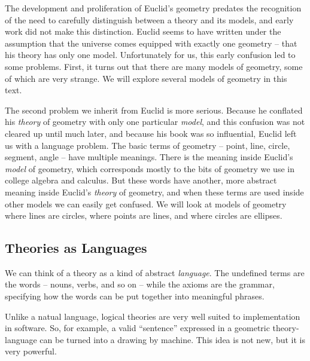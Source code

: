 The development and proliferation of Euclid's geometry predates the recognition of the need to carefully distinguish between a theory and its models, and early work did not make this distinction.
Euclid seems to have written under the assumption that the universe comes equipped with exactly one geometry -- that his theory has only one model.
Unfortunately for us, this early confusion led to some problems.
First, it turns out that there are many models of geometry, some of which are very strange.
We will explore several models of geometry in this text.

The second problem we inherit from Euclid is more serious.
Because he conflated his \emph{theory} of geometry with only one particular \emph{model}, and this confusion was not cleared up until much later, and because his book was so influential, Euclid left us with a language problem.
The basic terms of geometry -- point, line, circle, segment, angle -- have multiple meanings.
There is the meaning inside Euclid's \emph{model} of geometry, which corresponds mostly to the bits of geometry we use in college algebra and calculus.
But these words have another, more abstract meaning inside Euclid's \emph{theory} of geometry, and when these terms are used inside other models we can easily get confused.
We will look at models of geometry where lines are circles, where points are lines, and where circles are ellipses.

\subsection*{Theories as Languages}

We can think of a theory as a kind of abstract \emph{language}. The undefined terms are the words -- nouns, verbs, and so on -- while the axioms are the grammar, specifying how the words can be put together into meaningful phrases.

Unlike a natual language, logical theories are very well suited to implementation in software. So, for example, a valid ``sentence'' expressed in a geometric theory-language can be turned into a drawing by machine. This idea is not new, but it is very powerful.
